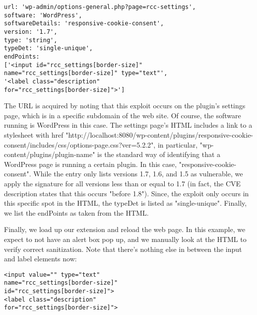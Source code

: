  \lstset{basicstyle=\small}
\begin{lstlisting}
url: 'wp-admin/options-general.php?page=rcc-settings',
software: 'WordPress',
softwareDetails: 'responsive-cookie-consent',
version: '1.7',
type: 'string',
typeDet: 'single-unique',
endPoints: 
['<input id="rcc_settings[border-size]" 
name="rcc_settings[border-size]" type="text"',
'<label class="description" 
for="rcc_settings[border-size]">']
\end{lstlisting}

The URL is acquired by noting that this exploit occurs on the plugin's settings page, which is in a specific subdomain of the web site. Of course, the software running is WordPress in this case. The settings page's HTML includes a link to a stylesheet with href "http://localhost:8080/wp-content/plugins/responsive-cookie-consent/includes/css/options-page.css?ver=5.2.2", in particular, "wp-content/plugins/plugin-name" is the standard way of identifying that a WordPress page is running a certain plugin. In this case, "responsive-cookie-consent". While the entry only lists versions 1.7, 1.6, and 1.5 as vulnerable, we apply the signature for all versions less than or equal to 1.7 (in fact, the CVE description states that this occurs "before 1.8").
Since, the exploit only occurs in this specific spot in the HTML, the typeDet is listed as "single-unique". Finally, we list the endPoints as taken from the HTML.

Finally, we load up our extension and reload the web page. In this example, we expect to not have an alert box pop up, and we manually look at the HTML to verify correct sanitization. Note that there's nothing else in between the input and label elements now:

\begin{lstlisting}
<input value="" type="text" 
name="rcc_settings[border-size]" 
id="rcc_settings[border-size]">
<label class="description"
for="rcc_settings[border-size]">
\end{lstlisting}


